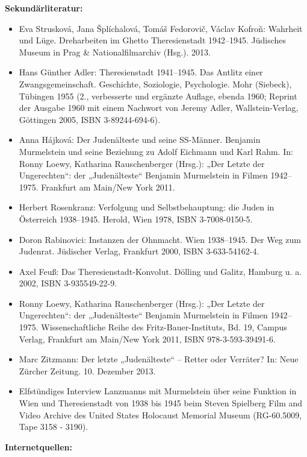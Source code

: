\documentclass[a4paper]{article}
\begin{document}
\bigskip

\textbf{Sekundärliteratur:}

\begin{itemize}
\item Eva Strusková, Jana Šplíchalová, Tomáš Fedorovič, Václav Kofroň: Wahrheit und Lüge. Dreharbeiten im Ghetto
Theresienstadt 1942–1945. Jüdisches Museum in Prag \& Nationalfilmarchiv (Hsg.). 2013.  
\item Hans Günther Adler: Theresienstadt 1941–1945. Das Antlitz einer Zwangsgemeinschaft. Geschichte, Soziologie,
Psychologie. Mohr (Siebeck), Tübingen 1955 (2., verbesserte und ergänzte Auflage, ebenda 1960; Reprint der Ausgabe 1960
mit einem Nachwort von Jeremy Adler, Wallstein-Verlag, Göttingen 2005, ISBN 3-89244-694-6).  
\item Anna Hájková: Der Judenälteste und seine SS-Männer. Benjamin Murmelstein und seine Beziehung zu Adolf Eichmann und
Karl Rahm. In: Ronny Loewy, Katharina Rauschenberger (Hrsg.): „Der Letzte der Ungerechten“: der „Judenälteste“ Benjamin
Murmelstein in Filmen 1942–1975. Frankfurt am Main/New York 2011.  
\item Herbert Rosenkranz: Verfolgung und Selbstbehauptung: die Juden in Österreich 1938–1945. Herold, Wien 1978, ISBN
3-7008-0150-5.  
\item Doron Rabinovici: Instanzen der Ohnmacht. Wien 1938–1945. Der Weg zum Judenrat. Jüdischer Verlag, Frankfurt 2000,
ISBN 3-633-54162-4.  
\item Axel Feuß: Das Theresienstadt-Konvolut. Dölling und Galitz, Hamburg u. a. 2002, ISBN 3-935549-22-9.  
\item Ronny Loewy, Katharina Rauschenberger (Hrsg.): „Der Letzte der Ungerechten“: der „Judenälteste“ Benjamin
Murmelstein in Filmen 1942–1975. Wissenschaftliche Reihe des Fritz-Bauer-Instituts, Bd. 19, Campus Verlag, Frankfurt am
Main/New York 2011, ISBN 978-3-593-39491-6.  
\item Marc Zitzmann: Der letzte „Judenälteste“ – Retter oder Verräter? In: Neue Zürcher Zeitung. 10. Dezember 2013.
\item Elfstündiges Interview Lanzmanns mit Murmelstein über seine Funktion in Wien und Theresienstadt von 1938 bis 1945
beim Steven Spielberg Film and Video Archive des United States Holocaust Memorial Museum (RG-60.5009, Tape 3158 -
3190). 
\end{itemize}

\bigskip


\bigskip

\textbf{Internetquellen:}
\end{document}
